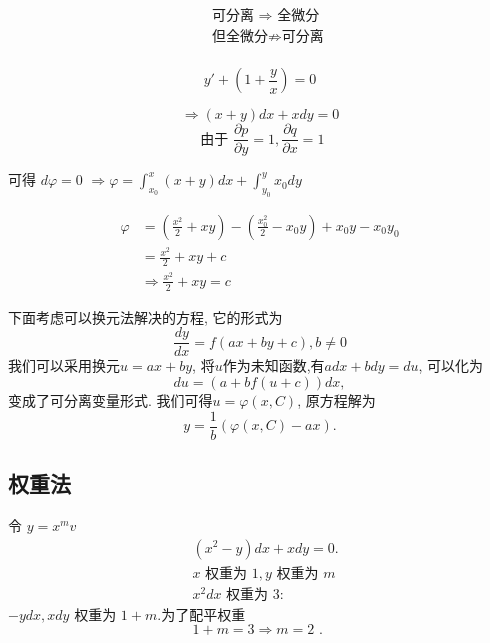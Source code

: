 $$
\begin{aligned}
    & \text { 可分离 } \Rightarrow \text { 全微分 } \\
    & \text { 但全微分} \nRightarrow \text{可分离} \\
\end{aligned}
$$

\begin{example}
$$
y'+\left(1+\frac{y}{x}\right)=0
$$
\end{example}
\begin{solution}
$$
\Rightarrow(x+y) d x+x d y=0
$$
$$
\text { 由于 } \frac{\partial p}{\partial y}=1, \frac{\partial q}{\partial x}=1
$$

可得 $d \varphi=0$
$\Rightarrow \varphi=\int_{x_0}^x(x+y) d x+\int_{y_0}^y x_0 d y$

\begin{equation}
    \begin{aligned}
    \varphi & =\left(\frac{x^2}{2}+x y\right)-\left(\frac{x_0^2}{2}-x_0 y\right)+x_0 y-x_0 y_0 \\
    & =\frac{x^2}{2}+x y+c \\
    & \Rightarrow \frac{x^2}{2}+x y=c
    \end{aligned}
    \end{equation}
\end{solution}

下面考虑可以换元法解决的方程, 它的形式为
\begin{equation}
    \frac{dy}{dx} = f(a x + by + c), b\neq 0
\end{equation}
我们可以采用换元$u = ax + by$, 将$u$作为未知函数,有$a dx + b dy = du $,
可以化为
\begin{equation}
    du  = ( a + b f(u+c) ) dx,
\end{equation}
变成了可分离变量形式. 我们可得$u  = \varphi (x, C)$, 原方程解为
\begin{equation}
    y = \frac{1}{b} \left(\varphi(x, C) - a x \right).
\end{equation}

\subsection{权重法}
令 $y=x^{m}v$
$$
\begin{aligned}
& \left(x^2-y\right) d x+x d y=0 . \\
& x \text { 权重为 } 1, y\text { 权重为 }m \\
& x^2 d x \text { 权重为 } 3:
\end{aligned}
$$
$-ydx,  x d y$ 权重为 $1+m$.为了配平权重
$$
1+m=3 \Rightarrow m=2 \text { . }
$$


